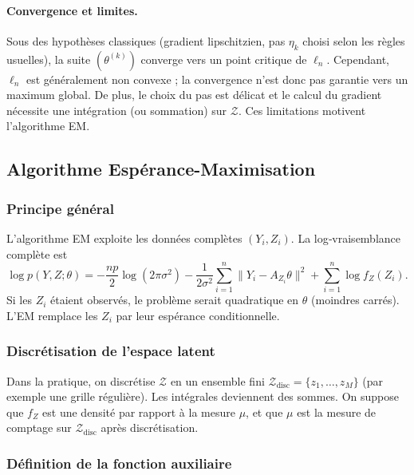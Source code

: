 \documentclass[12pt, a4paper]{article}
\theoremstyle{definition}
\begin{document}
\paragraph{Convergence et limites.}
Sous des hypothèses classiques (gradient lipschitzien, pas $\eta_k$ choisi selon les règles usuelles), la suite $(\theta^{(k)})$ converge vers un point critique de $\ell_n$. Cependant, $\ell_n$ est généralement non convexe ; la convergence n'est donc pas garantie vers un maximum global. De plus, le choix du pas est délicat et le calcul du gradient nécessite une intégration (ou sommation) sur $\mathcal{Z}$. Ces limitations motivent l'algorithme EM.

\subsection{Algorithme Espérance-Maximisation}
\label{subsec:em}

\subsubsection{Principe général}

L'algorithme EM exploite les données complètes $(Y_i,Z_i)$. La log‑vraisemblance complète est
\[
\log p(Y,Z;\theta)
= -\frac{np}{2}\log(2\pi\sigma^2)
- \frac{1}{2\sigma^2} \sum_{i=1}^n \|Y_i - A_{Z_i}\theta\|^2
+ \sum_{i=1}^n \log f_Z(Z_i).
\]
Si les $Z_i$ étaient observés, le problème serait quadratique en $\theta$ (moindres carrés). L'EM remplace les $Z_i$ par leur espérance conditionnelle.

\subsubsection{Discrétisation de l'espace latent}

Dans la pratique, on discrétise $\mathcal{Z}$ en un ensemble fini $\mathcal{Z}_{\text{disc}} = \{z_1,\dots,z_M\}$ (par exemple une grille régulière). Les intégrales deviennent des sommes. On suppose que $f_Z$ est une densité par rapport à la mesure $\mu$, et que $\mu$ est la mesure de comptage sur $\mathcal{Z}_{\text{disc}}$ après discrétisation.

\subsubsection{Définition de la fonction auxiliaire}
\end{document}
